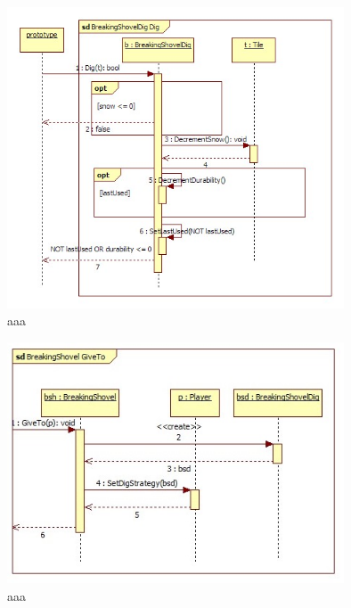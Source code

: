 \begin{figure}[H]
        \begin{center}
                \includegraphics[width=10cm]{chapters/chapter07/seqdiag/BreakingShovelDig_Dig.jpg}
                \caption{aaa}
                \label{bbb}
        \end{center}
\end{figure}
\begin{figure}[H]
        \begin{center}
                \includegraphics[width=10cm]{chapters/chapter07/seqdiag/BreakingShovel_GiveTo.jpg}
                \caption{aaa}
                \label{bbb}
        \end{center}
\end{figure}
